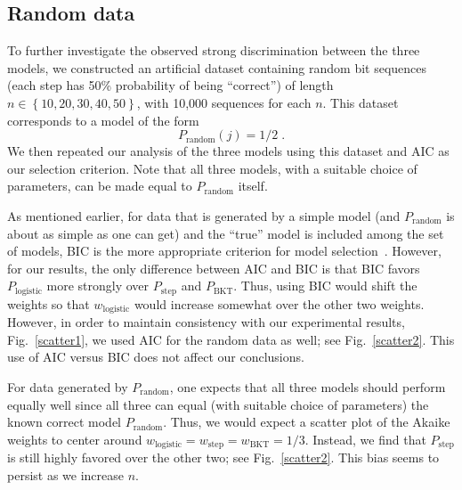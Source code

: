 \documentclass{edm_template}
\begin{document}
\subsection{Random data}


To further investigate the observed strong discrimination
between the three models, we constructed an
artificial dataset containing random bit sequences (each
step has 50\% probability of being ``correct'') of length 
$n\in\left\{10,20,30,40,50\right\}$, with 10,000 sequences for 
each $n$.
This dataset corresponds to a model of the form
%
\begin{equation}
        P_\mathrm{random}(j)=1/2 \; .
\end{equation}
%
We then repeated our analysis of the three models using this dataset
and AIC as our selection criterion.  Note that all three models,
with a suitable choice of parameters, can be made equal to 
$P_\mathrm{random}$ itself.


As mentioned earlier, for data that is generated by a simple 
model (and $P_\mathrm{random}$ is about as
simple as one can get) and the ``true'' model is included among
the set of models, BIC is the more appropriate criterion
for model selection~\cite[Sections~6.3 \& 6.4]{burnham_model_2002}.
However, for our results, the only difference between AIC and BIC 
is that BIC favors $P_\mathrm{logistic}$ more strongly over 
$P_\mathrm{step}$ and $P_\mathrm{BKT}$.  Thus, using BIC would shift 
the weights so that $w_\mathrm{logistic}$ would increase somewhat over 
the other two weights.  However, in order to maintain consistency with
our experimental results, Fig.~\ref{scatter1}, we used AIC for the random data as well;
see Fig.~\ref{scatter2}.  This use of AIC versus BIC does not 
affect our conclusions.

For data generated by $P_\mathrm{random}$,
one expects that all three models should perform equally
well since all three can equal (with suitable choice of parameters)
the known correct model $P_\mathrm{random}$.  Thus, we would expect
a scatter plot of the Akaike weights to center around
$w_\mathrm{logistic}=w_\mathrm{step}=w_\mathrm{BKT}=1/3$.  Instead, we
find that $P_\mathrm{step}$ is still highly favored over the other two; see
Fig.~\ref{scatter2}. This bias seems to persist as we increase $n$.
\end{document}
